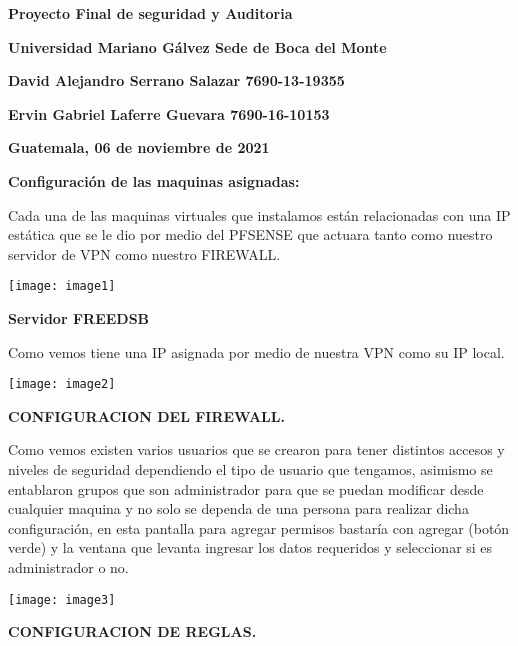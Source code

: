 

\noindent \textbf{Proyecto Final de seguridad y Auditoria}

\noindent \textbf{Universidad Mariano G\'{a}lvez Sede de Boca del Monte}

\noindent \textbf{David Alejandro Serrano Salazar 7690-13-19355}

\noindent \textbf{Ervin Gabriel Laferre Guevara 7690-16-10153}

\noindent \textbf{Guatemala, 06 de noviembre de 2021}

\noindent \textbf{}

\noindent \textbf{}

\noindent \textbf{Configuraci\'{o}n de las maquinas asignadas:}

\noindent 

\noindent Cada una de las maquinas virtuales que instalamos est\'{a}n relacionadas con una IP est\'{a}tica que se le dio por medio del PFSENSE que actuara tanto como nuestro servidor de VPN como nuestro FIREWALL.

\noindent 

\noindent \texttt{[image: image1]}

\noindent \textbf{Servidor FREEDSB}

\noindent Como vemos tiene una IP asignada por medio de nuestra VPN como su IP local.

\noindent 

\noindent \texttt{[image: image2]}

\noindent 

\noindent \textbf{CONFIGURACION DEL FIREWALL.}

\noindent Como vemos existen varios usuarios que se crearon para tener distintos accesos y niveles de seguridad dependiendo el tipo de usuario que tengamos, asimismo se entablaron grupos que son administrador para que se puedan modificar desde cualquier maquina y no solo se dependa de una persona para realizar dicha configuraci\'{o}n, en esta pantalla para agregar permisos bastar\'{i}a con agregar (bot\'{o}n verde) y la ventana que levanta ingresar los datos requeridos y seleccionar si es administrador o no.

\noindent 

\noindent \texttt{[image: image3]}

\noindent 

\noindent \textbf{CONFIGURACION DE REGLAS.}

